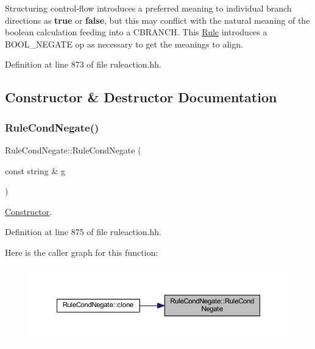 Structuring control-\/flow introduces a preferred meaning to individual branch directions as {\bfseries{true}} or {\bfseries{false}}, but this may conflict with the natural meaning of the boolean calculation feeding into a C\+B\+R\+A\+N\+CH. This \mbox{\hyperlink{class_rule}{Rule}} introduces a B\+O\+O\+L\+\_\+\+N\+E\+G\+A\+TE op as necessary to get the meanings to align. 

Definition at line 873 of file ruleaction.\+hh.



\subsection{Constructor \& Destructor Documentation}
\mbox{\label{class_rule_cond_negate_a1c84b28ea18d19694633f99915dba439}} 
\subsubsection{\texorpdfstring{RuleCondNegate()}{RuleCondNegate()}}
{\footnotesize\ttfamily Rule\+Cond\+Negate\+::\+Rule\+Cond\+Negate (\begin{DoxyParamCaption}\item[{const string \&}]{g }\end{DoxyParamCaption})\hspace{0.3cm}{\ttfamily [inline]}}



\mbox{\hyperlink{class_constructor}{Constructor}}. 



Definition at line 875 of file ruleaction.\+hh.

Here is the caller graph for this function\+:
\nopagebreak
\begin{figure}[H]
\begin{center}
\leavevmode
\includegraphics[width=350pt]{class_rule_cond_negate_a1c84b28ea18d19694633f99915dba439_icgraph}
\end{center}
\end{figure}


